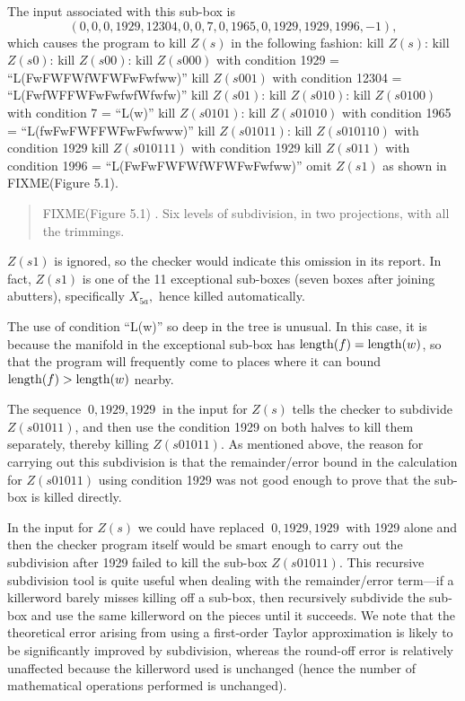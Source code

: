 The input associated with this sub-box is
$$(0, 0, 0, 1929, 12304, 0, 0, 7, 0, 1965, 0, 1929, 1929, 1996, -1),$$
which causes the program to kill $Z(s)$ in the following fashion:
{\noindent\obeylines
\def\>{\hskip 0.05in}
 kill $Z(s)$:
\>kill $Z(s0)$:
\>\>kill $Z(s00)$:
\>\>\>kill $Z(s000)$ with condition 1929 = ``L(FwFWFWfWFWFwFwfww)''
\>\>\>kill $Z(s001)$ with condition 12304 = ``L(FwfWFFWFwFwfwfWfwfw)''
\>\>kill $Z(s01)$:
\>\>\>kill $Z(s010)$:
\>\>\>\>kill $Z(s0100)$ with condition 7 = ``L(w)''
\>\>\>\>kill $Z(s0101)$:
\>\>\>\>\>kill $Z(s01010)$ with condition 1965 = ``L(fwFwFWFFWFwFwfwww)''
\>\>\>\>\>kill $Z(s01011)$:
\>\>\>\>\>\>kill $Z(s010110)$ with condition 1929
\>\>\>\>\>\>kill $Z(s010111)$ with condition 1929
\>\>\>kill $Z(s011)$ with condition 1996 = ``L(FwFwFWFWfWFWFwFwfww)''
\>omit $Z(s1)$
\noindent as shown in 
FIXME(Figure 5.1).
}

 
 \centerline{}

 \begin{quote}{
FIXME(Figure 5.1)
.  Six levels of subdivision, in two projections,
 with all the trimmings.}
 \end{quote}

$Z(s1)$ is ignored, so the checker would indicate this omission
in its report.  In fact, $Z(s1)$ is one of the 11 exceptional sub-boxes (seven boxes after joining abutters), specifically
$X_{5a},$ hence killed automatically.

The use of condition ``L(w)'' so deep in the tree is unusual.
In this case, it is because the manifold in the exceptional sub-box
has ${\rm length}(f) = {\rm length}(w)$, so that the program will frequently
come to places where it can bound ${\rm length}(f) > {\rm length}(w)$ nearby.

The sequence $\ 0, 1929, 1929\ $ in the 
input for $Z(s)$ tells the checker to
subdivide $Z(s01011)$, and then use the condition 1929
on both halves to kill   them separately, 
thereby killing $Z(s01011)$.
As mentioned above,
the reason for carrying out this  subdivision 
is that the remainder/error bound in the calculation
 for $Z(s01011)$ using condition 1929 was not good enough
to prove that the sub-box is killed directly. 
 
 


In the input for $Z(s)$ we could have
replaced 
 $\ 0, 1929, 1929\ $ with 1929 alone
and then the checker
program itself would be smart enough to carry out
the subdivision after 1929 failed to kill the sub-box
$Z(s01011).$
This recursive subdivision tool is quite useful when dealing with the 
remainder/error term---if a killerword barely misses killing off a sub-box, then recursively subdivide the sub-box and
use the same killerword on the pieces until it succeeds.   We note that the theoretical error arising from using a
first-order Taylor approximation is likely to be significantly improved by subdivision, whereas the
round-off error is relatively unaffected because the killerword
used is unchanged (hence the number of mathematical operations
performed is unchanged).

